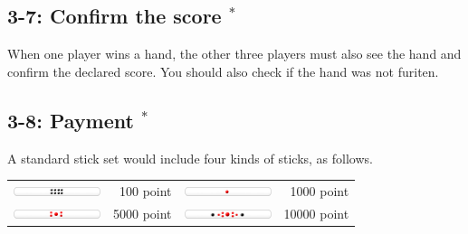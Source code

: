 \subsection*{3-7: Confirm the score $^{*}$}
When one player wins a hand, the other three players must also see the hand and confirm the declared score. You should also check if the hand was not {\jap furiten}. 

\subsection*{3-8: Payment $^{*}$}
A standard stick set would include four kinds of sticks, as follows.

\bigskip
\begin{tabular}{l r l r}
\includegraphics[width=1in]{figs/tenbou100} & 100 point & 
\includegraphics[width=1in]{figs/tenbou1000} & 1000 point \\
\includegraphics[width=1in]{figs/tenbou5000} & 5000 point & 
\includegraphics[width=1in]{figs/tenbou10000} & 10000 point \\
\end{tabular}

